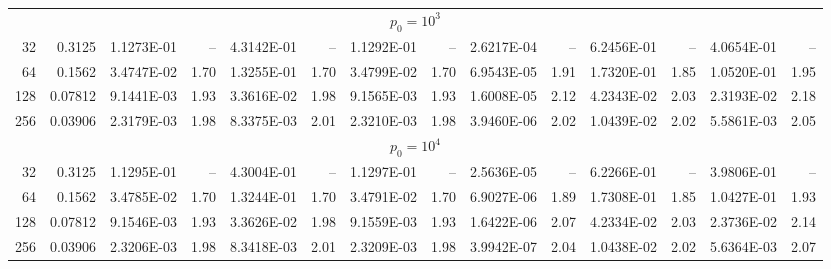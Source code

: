 \begin{tabular}{rrrrrrrrrrrrrr}
\multicolumn{14}{c}{$p_0=10^{3}$} \\
32 & 0.3125 & 1.1273E-01 & -- & 4.3142E-01 & -- & 1.1292E-01 & -- & 2.6217E-04 & -- & 6.2456E-01 & -- & 4.0654E-01 & -- \\
64 & 0.1562 & 3.4747E-02 & 1.70 & 1.3255E-01 & 1.70 & 3.4799E-02 & 1.70 & 6.9543E-05 & 1.91 & 1.7320E-01 & 1.85 & 1.0520E-01 & 1.95 \\
128 & 0.07812 & 9.1441E-03 & 1.93 & 3.3616E-02 & 1.98 & 9.1565E-03 & 1.93 & 1.6008E-05 & 2.12 & 4.2343E-02 & 2.03 & 2.3193E-02 & 2.18 \\
256 & 0.03906 & 2.3179E-03 & 1.98 & 8.3375E-03 & 2.01 & 2.3210E-03 & 1.98 & 3.9460E-06 & 2.02 & 1.0439E-02 & 2.02 & 5.5861E-03 & 2.05 \\
\multicolumn{14}{c}{$p_0=10^{4}$} \\
32 & 0.3125 & 1.1295E-01 & -- & 4.3004E-01 & -- & 1.1297E-01 & -- & 2.5636E-05 & -- & 6.2266E-01 & -- & 3.9806E-01 & -- \\
64 & 0.1562 & 3.4785E-02 & 1.70 & 1.3244E-01 & 1.70 & 3.4791E-02 & 1.70 & 6.9027E-06 & 1.89 & 1.7308E-01 & 1.85 & 1.0427E-01 & 1.93 \\
128 & 0.07812 & 9.1546E-03 & 1.93 & 3.3626E-02 & 1.98 & 9.1559E-03 & 1.93 & 1.6422E-06 & 2.07 & 4.2334E-02 & 2.03 & 2.3736E-02 & 2.14 \\
256 & 0.03906 & 2.3206E-03 & 1.98 & 8.3418E-03 & 2.01 & 2.3209E-03 & 1.98 & 3.9942E-07 & 2.04 & 1.0438E-02 & 2.02 & 5.6364E-03 & 2.07 \\
\hline
\end{tabular}
